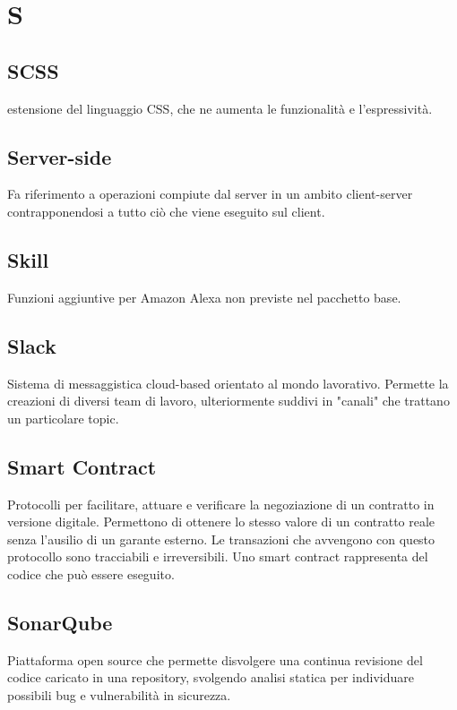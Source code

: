 \section*{S}
\subsection*{SCSS}
estensione del linguaggio CSS, che ne aumenta le funzionalità e l'espressività.

\subsection*{Server-side}
Fa riferimento a operazioni compiute dal server in un ambito client-server contrapponendosi a tutto ciò che viene eseguito sul client.

\subsection*{Skill}
Funzioni aggiuntive per Amazon Alexa non previste nel pacchetto base.

\subsection*{Slack}
Sistema di messaggistica cloud-based orientato al mondo lavorativo. Permette la creazioni di diversi team di lavoro, ulteriormente suddivi in "canali" che trattano un particolare topic.

\subsection*{Smart Contract}
Protocolli per facilitare, attuare e verificare la negoziazione di un contratto in versione digitale. Permettono di ottenere lo stesso valore di un contratto reale senza l'ausilio di un garante esterno. Le transazioni che avvengono con questo protocollo sono tracciabili e irreversibili. Uno smart contract rappresenta del codice che può essere eseguito.

\subsection*{SonarQube}
Piattaforma open source che permette disvolgere una continua revisione del codice caricato in una repository, svolgendo analisi statica per individuare possibili bug e vulnerabilità in sicurezza.

